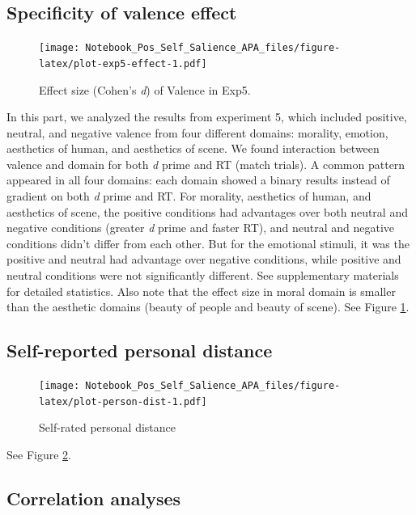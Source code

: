 \documentclass[
  english,
  man]{apa6}
\begin{document}
\hypertarget{specificity-of-valence-effect}{%
\subsection{Specificity of valence effect}\label{specificity-of-valence-effect}}

\begin{figure}
\centering
\texttt{[image: Notebook\_Pos\_Self\_Salience\_APA\_files/figure-latex/plot-exp5-effect-1.pdf]}
\caption{\label{fig:plot-exp5-effect}Effect size (Cohen's \emph{d}) of Valence in Exp5.}
\end{figure}

In this part, we analyzed the results from experiment 5, which included positive, neutral, and negative valence from four different domains: morality, emotion, aesthetics of human, and aesthetics of scene. We found interaction between valence and domain for both \emph{d} prime and RT (match trials). A common pattern appeared in all four domains: each domain showed a binary results instead of gradient on both \emph{d} prime and RT. For morality, aesthetics of human, and aesthetics of scene, the positive conditions had advantages over both neutral and negative conditions (greater \emph{d} prime and faster RT), and neutral and negative conditions didn't differ from each other. But for the emotional stimuli, it was the positive and neutral had advantage over negative conditions, while positive and neutral conditions were not significantly different. See supplementary materials for detailed statistics. Also note that the effect size in moral domain is smaller than the aesthetic domains (beauty of people and beauty of scene). See Figure \ref{fig:plot-exp5-effect}.

\hypertarget{self-reported-personal-distance}{%
\subsection{Self-reported personal distance}\label{self-reported-personal-distance}}

\begin{figure}
\centering
\texttt{[image: Notebook\_Pos\_Self\_Salience\_APA\_files/figure-latex/plot-person-dist-1.pdf]}
\caption{\label{fig:plot-person-dist}Self-rated personal distance}
\end{figure}

See Figure \ref{fig:plot-person-dist}.

\hypertarget{correlation-analyses}{%
\subsection{Correlation analyses}\label{correlation-analyses}}
\end{document}
